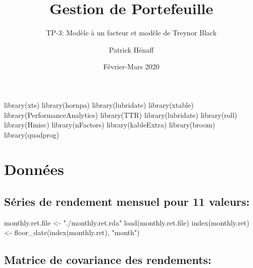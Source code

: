 \documentclass[
]{article}
\title{Gestion de Portefeuille}
\subtitle{TP-3: Modèle à un facteur et modèle de Treynor Black}
\author{Patrick Hénaff}
\date{Février-Mars 2020}
\newenvironment{Shaded}{\begin{snugshade}}{\end{snugshade}}
\newcommand{\FunctionTok}[1]{\textcolor[rgb]{0.00,0.00,0.00}{#1}}
\newcommand{\NormalTok}[1]{#1}
\newcommand{\OtherTok}[1]{\textcolor[rgb]{0.56,0.35,0.01}{#1}}
\newcommand{\StringTok}[1]{\textcolor[rgb]{0.31,0.60,0.02}{#1}}
\begin{document}
\maketitle

\begin{Shaded}
\begin{Highlighting}[]
\FunctionTok{library}\NormalTok{(xts)}
\FunctionTok{library}\NormalTok{(hornpa)}
\FunctionTok{library}\NormalTok{(lubridate)}
\FunctionTok{library}\NormalTok{(xtable)}
\FunctionTok{library}\NormalTok{(PerformanceAnalytics)}
\FunctionTok{library}\NormalTok{(TTR)}
\FunctionTok{library}\NormalTok{(lubridate)}
\FunctionTok{library}\NormalTok{(roll)}
\FunctionTok{library}\NormalTok{(Hmisc)}
\FunctionTok{library}\NormalTok{(nFactors)}
\FunctionTok{library}\NormalTok{(kableExtra)}
\FunctionTok{library}\NormalTok{(broom)}
\FunctionTok{library}\NormalTok{(quadprog)}
\end{Highlighting}
\end{Shaded}

\hypertarget{donnuxe9es}{%
\section{Données}\label{donnuxe9es}}

\hypertarget{suxe9ries-de-rendement-mensuel-pour-11-valeurs}{%
\subsection{Séries de rendement mensuel pour 11
valeurs:}\label{suxe9ries-de-rendement-mensuel-pour-11-valeurs}}

\begin{Shaded}
\begin{Highlighting}[]
\NormalTok{monthly.ret.file }\OtherTok{\textless{}{-}} \StringTok{"./monthly.ret.rda"}
\FunctionTok{load}\NormalTok{(monthly.ret.file)}
\FunctionTok{index}\NormalTok{(monthly.ret) }\OtherTok{\textless{}{-}} \FunctionTok{floor\_date}\NormalTok{(}\FunctionTok{index}\NormalTok{(monthly.ret), }\StringTok{"month"}\NormalTok{)}
\end{Highlighting}
\end{Shaded}

\hypertarget{matrice-de-covariance-des-rendements}{%
\subsection{Matrice de covariance des
rendements:}\label{matrice-de-covariance-des-rendements}}
\end{document}
